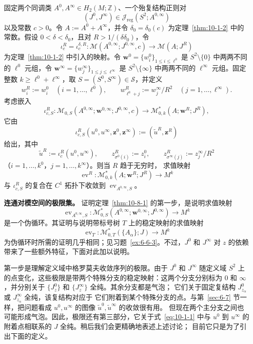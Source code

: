 \begin{corollary}\label{cor:10-8-3}
固定两个同调类 $A^0,A^\infty\in H_2(M;\mathbb Z)$、一个殆复结构正则对
\[
  (J^0,J^\infty)\in\mathcal J_{\mathrm{reg}}(S^2;A^{0,\infty})
\]
以及常数 $c>0$。令 $A:=A^0+A^\infty$，并令
$\delta_0=\delta_0(c)$ 为定理~\ref{thm:10-1-2} 中的常数。假设
$0<\delta<\delta_0$，且对 $R>1/(\delta\delta_0)$，令
\[
  \iota_c^R=\iota_c^{\delta,R}:
  \mathcal M(A^{0,\infty};J^{0,\infty},c)
  \longrightarrow\mathcal M(A;J^R)
\]
为定理~\ref{thm:10-1-2} 中引入的映射。令
$\mathbf w^0=\{w_i^0\}_{1\leq i\leq\ell^0}$ 是
$S^2\setminus\{0\}$ 中两两不同的 $\ell^0$ 元组，令
$\mathbf w^\infty=\{w_j^\infty\}_{1\leq j\leq\ell^\infty}$ 是
$S^2\setminus\{\infty\}$ 中两两不同的 $\ell^\infty$ 元组。固定整数
$k\geq\ell^0+\ell^\infty$，取 $S=(S^0,S^\infty)\in\mathcal S$，并定义
\[
  w_i^R:=w_i^0\quad(i=1,\ldots,\ell^0),
  \qquad
  w_{\ell^0+j}^R:=w_j^\infty/R^2
  \quad(j=1,\ldots,\ell^\infty).
\]
考虑嵌入
\[
  \iota_{c,S}^R:
  \mathcal M_{0,S}(A^{0,\infty};\mathbf w^{0,\infty};J^{0,\infty},c)
  \longrightarrow
  \mathcal M_{0,k}^*(A;\mathbf w^R;J^R),
\]
它由
\[
  \iota_{c,S}^R(u^0,u^\infty,\mathbf z^0,\mathbf z^\infty)
  :=(\widetilde u^R,\mathbf z^R)
\]
给出，其中
\[
  \widetilde u^R:=\iota_c^R(u^0,u^\infty),
  \qquad z_{\sigma^0(i)}^R:=z_i^0,
  \qquad z_{\sigma^\infty(j)}^R:=z_j^\infty/R^2
\]
（$i=1,\ldots,k^0$，$j=1,\ldots,k^\infty$）。则当 $R$ 趋于无穷时，
求值映射
\[
  \operatorname{ev}^R:\mathcal M_{0,k}^*(A;\mathbf w^R;J^R)\longrightarrow M^k
\]
与 $\iota_{c,S}^R$ 的复合在 $C^1$ 拓扑下收敛到
$\operatorname{ev}_{A^{0,\infty},S}$。
\end{corollary}

\medskip
\noindent\textbf{连通对模空间的极限集。}
证明定理~\ref{thm:10-8-1} 的第一步，是说明求值映射
\[
  \operatorname{ev}_{A^{0,\infty},S}:
  \mathcal M_{0,S}^*(A^{0,\infty};\mathbf w^{0,\infty};J^{0,\infty})
  \longrightarrow M^k
\]
是一个伪循环。其证明与说明带标号树 $T$ 上的稳定映射的求值映射
\[
  \operatorname{ev}_T:\mathcal M_{0,T}^*(\{A_\alpha\};J)\longrightarrow M^k
\]
为伪循环时所需的证明几乎相同；见习题~\ref{ex:6-6-3}。不过，$J^0$ 和
$J^\infty$ 对 $z$ 的依赖带来了一些额外特征，下面对此加以说明。

第一步是理解定义域中格罗莫夫收敛序列的极限。由于 $J^0$ 和 $J^\infty$ 随定义域
$S^2$ 上的点变化，这些极限是带两个特殊分支的稳定映射：这两个分支分别标为 $0$ 和
$\infty$，并分别关于 $\{J_z^0\}$ 和 $\{J_z^\infty\}$ 全纯。其余分支都是气泡；
它们关于固定复结构 $J_{z_\alpha}^0$ 或 $J_{z_\alpha}^\infty$ 全纯，该复结构对应于
它们附着到某个特殊分支的点。与第~\ref{sec:6-7} 节一样，把问题看成
$u^0,u^\infty$ 的图像 $\widetilde u^0,\widetilde u^\infty$ 的收敛很有用。
但现在两个主分支之间也可能形成气泡。因此，极限还有第三部分，它关于式~\eqref{eq:10-1-1}
中与 $u^0$ 到 $u^\infty$ 的附着点相联系的 $J$ 全纯。稍后我们会更精确地表述上述讨论；
目前它只是为了引出下面的定义。

